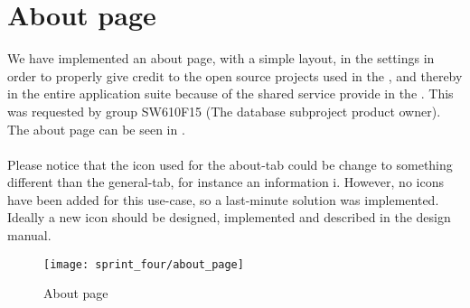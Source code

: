 
\section{About page}
\label{sec:about_page}

We have implemented an about page, with a simple layout, in the \launcher settings in order to properly give credit to the open source projects used in the \launcher, and thereby in the entire \giraf application suite because of the shared service provide in the \launcher. This was requested by group SW610F15 (The database subproject product owner). The about page can be seen in .
\\\\
Please notice that the icon used for the about-tab could be change to something different than the general-tab, for instance an information i. However, no icons have been added for this use-case, so a last-minute solution was implemented. Ideally a new icon should be designed, implemented and described in the design manual.

\begin{figure}[!htbp]
	\centering
	\texttt{[image: sprint\_four/about\_page]}
	\caption{About page}
	\label{fig:about_page}
\end{figure}
